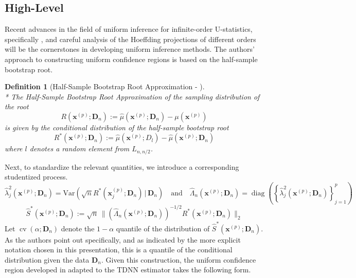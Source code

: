\documentclass[letterpaper,10pt]{article}
\numberwithin{equation}{section}
\numberwithin{thm}{section}
\newtheorem{dfn}{Definition}
\numberwithin{lem}{section}
\numberwithin{cor}{section}
\renewcommand{\hat}{\widehat}
\newcommand{\1}{\mathbbm{1}}
\newcommand{\Var}{\text{Var}}
\begin{document}
\subsection{High-Level}
Recent advances in the field of uniform inference for infinite-order U-statistics, specifically \citet{ritzwoller_uniform_2024}, and careful analysis of the Hoeffding projections of different orders will be the cornerstones in developing uniform inference methods.
The authors' approach to constructing uniform confidence regions is based on the half-sample bootstrap root.


\begin{dfn}[Half-Sample Bootstrap Root Approximation - \citet{ritzwoller_uniform_2024}]\mbox{}\\*
	The Half-Sample Bootstrap Root Approximation of the sampling distribution of the root
	\begin{equation}
		R\left(\mathbf{x}^{(p)}; \mathbf{D}_n\right)
		:= \hat{\mu}\left(\mathbf{x}^{(p)}; \mathbf{D}_n\right) - \mu(\mathbf{x}^{(p)})
	\end{equation}
	is given by the conditional distribution of the half-sample bootstrap root
	\begin{equation}
		R^{*}\left(\mathbf{x}^{(p)}; \mathbf{D}_n\right)
		:= \hat{\mu}\left(\mathbf{x}^{(p)}; D_l\right) - \hat{\mu}\left(\mathbf{x}^{(p)}; \mathbf{D}_n\right)
	\end{equation}
	where $l$ denotes a random element from $L_{n, n/2}$.
\end{dfn}
Next, to standardize the relevant quantities, we introduce a corresponding studentized process.
\begin{equation}
	\hat{\lambda}_{j}^{2}\left(\mathbf{x}^{(p)}; \mathbf{D}_n\right) = \Var\left(\sqrt{n} R^{*}(\mathbf{x}^{(p)}_{j}; \mathbf{D}_n) \, | \, \mathbf{D}_n\right)
	\quad \text{and} \quad
	\hat{\Lambda}_n\left(\mathbf{x}^{(p)}; \mathbf{D}_n\right) = \operatorname{diag}\left(\left\{\hat{\lambda}_{j}^{2}\left(\mathbf{x}^{(p)}; \mathbf{D}_n\right)\right\}_{j = 1}^{p}\right)
\end{equation}
\begin{equation}
	\hat{S}^{*}\left(\mathbf{x}^{(p)}; \mathbf{D}_n\right)
	:= \sqrt{n} \, \Big\| \left(\hat{\Lambda}_n\left(\mathbf{x}^{(p)}; \mathbf{D}_n\right)\right)^{-1/2} R^{*}\left(\mathbf{x}^{(p)}; \mathbf{D}_n\right)\Big\|_{2}
\end{equation}
Let $\operatorname{cv}\left(\alpha; \mathbf{D}_n\right)$ denote the $1-\alpha$ quantile of the distribution of $\hat{S}^{*}\left(\mathbf{x}^{(p)}; \mathbf{D}_n\right)$.
As the authors point out specifically, and as indicated by the more explicit notation chosen in this presentation, this is a quantile of the conditional distribution given the data $\mathbf{D}_n$.
Given this construction, the uniform confidence region developed in \citet{ritzwoller_uniform_2024} adapted to the TDNN estimator takes the following form.
\end{document}
